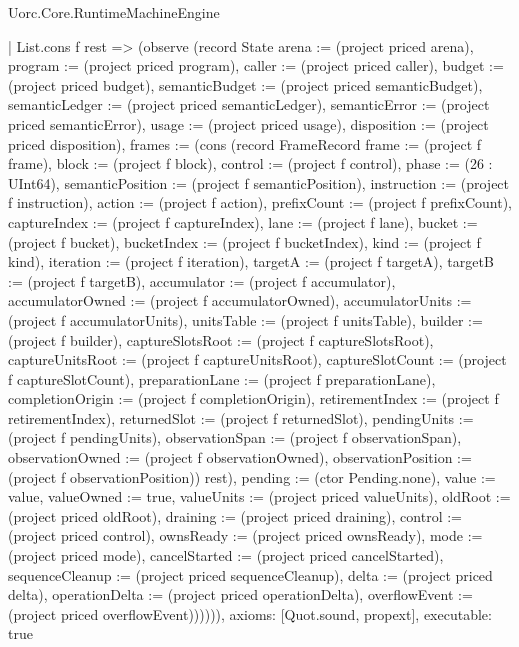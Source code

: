\begin{lexlean}{Uorc.Core.RuntimeMachineEngine}
\begin{semanticmodule}
{      | List.cons f rest => (observe (record State {arena := (project priced arena), program := (project priced program), caller := (project priced caller), budget := (project priced budget), semanticBudget := (project priced semanticBudget), semanticLedger := (project priced semanticLedger), semanticError := (project priced semanticError), usage := (project priced usage), disposition := (project priced disposition), frames := (cons (record FrameRecord {frame := (project f frame), block := (project f block), control := (project f control), phase := (26 : UInt64), semanticPosition := (project f semanticPosition), instruction := (project f instruction), action := (project f action), prefixCount := (project f prefixCount), captureIndex := (project f captureIndex), lane := (project f lane), bucket := (project f bucket), bucketIndex := (project f bucketIndex), kind := (project f kind), iteration := (project f iteration), targetA := (project f targetA), targetB := (project f targetB), accumulator := (project f accumulator), accumulatorOwned := (project f accumulatorOwned), accumulatorUnits := (project f accumulatorUnits), unitsTable := (project f unitsTable), builder := (project f builder), captureSlotsRoot := (project f captureSlotsRoot), captureUnitsRoot := (project f captureUnitsRoot), captureSlotCount := (project f captureSlotCount), preparationLane := (project f preparationLane), completionOrigin := (project f completionOrigin), retirementIndex := (project f retirementIndex), returnedSlot := (project f returnedSlot), pendingUnits := (project f pendingUnits), observationSpan := (project f observationSpan), observationOwned := (project f observationOwned), observationPosition := (project f observationPosition)}) rest), pending := (ctor Pending.none), value := value, valueOwned := true, valueUnits := (project priced valueUnits), oldRoot := (project priced oldRoot), draining := (project priced draining), control := (project priced control), ownsReady := (project priced ownsReady), mode := (project priced mode), cancelStarted := (project priced cancelStarted), sequenceCleanup := (project priced sequenceCleanup), delta := (project priced delta), operationDelta := (project priced operationDelta), overflowEvent := (project priced overflowEvent)}))))),
  axioms: [Quot.sound, propext],
  executable: true
}


\end{semanticmodule}
\end{lexlean}
